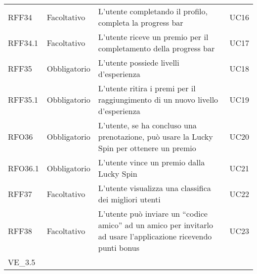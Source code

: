 \begin{longtable}{ >{\centering}p{} >{\centering}p{}
		>{\raggedright}p{} >{\centering}p{}}
	RFF34 &	Facoltativo &	L’utente completando il profilo, completa la progress bar &	UC16 \tabularnewline
	RFF34.1	& Facoltativo &	L’utente riceve un premio per il completamento della progress bar &	UC17 \tabularnewline
	RFF35 &	Obbligatorio &	L’utente possiede livelli d’esperienza & UC18 \tabularnewline
	RFF35.1	& Obbligatorio & L’utente ritira i premi per il raggiungimento di un nuovo livello d’esperienza & UC19 \tabularnewline
	RFO36 & Obbligatorio & L’utente, se ha concluso una prenotazione, può usare la Lucky Spin per ottenere un premio & UC20 \tabularnewline
	RFO36.1	& Obbligatorio & L’utente vince un premio dalla Lucky Spin & UC21 \tabularnewline
	RFF37 & Facoltativo & L’utente visualizza una classifica dei migliori utenti & UC22 \tabularnewline
	RFF38 & Facoltativo & L’utente può inviare un “codice amico” ad un amico per invitarlo ad usare l’applicazione ricevendo punti bonus & UC23 \\ VE\_3.5
	
\end{longtable}

